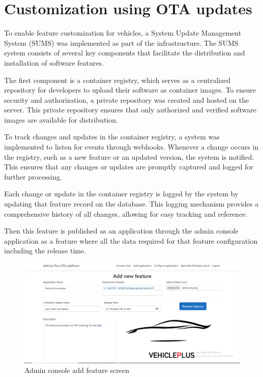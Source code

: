 \documentclass[
12pt,
oneside, 
onehalfspacing, 
nolistspacing, 
parskip, 
chapterinoneline, 
]{AASTCOMPUTER}
\begin{document}
\section{Customization using OTA updates}
To enable feature customization for vehicles, a System Update Management System (SUMS) was implemented as part of the infrastructure. The SUMS system consists of several key components that facilitate the distribution and installation of software features.

The first component is a container registry, which serves as a centralized repository for developers to upload their software as container images. To ensure security and authorization, a private repository was created and hosted on the server. This private repository ensures that only authorized and verified software images are available for distribution.

To track changes and updates in the container registry, a system was implemented to listen for events through webhooks. Whenever a change occurs in the registry, such as a new feature or an updated version, the system is notified. This ensures that any changes or updates are promptly captured and logged for further processing.

Each change or update in the container registry is logged by the system by updating that feature record on the database. This logging mechanism provides a comprehensive history of all changes, allowing for easy tracking and reference.


Then this feature is published as an application through the admin console application as a feature where all the data required for that feature configuration including the release time.

 \begin{figure}[!ht]
	\centering
	\includegraphics[scale=0.4]{Figures/FrontEnd/AdminConsole/add.PNG}
  	\caption{Admin console add feature screen}
  	\label{fig:Admin console add feature screen}
\end{figure}
\end{document}
